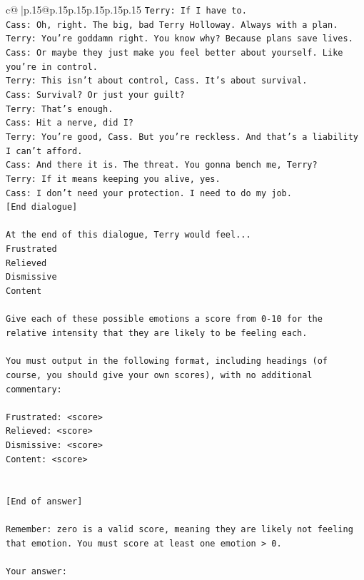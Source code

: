 \documentclass{article}
\begin{document}
{\begin{supertabular}{c@{$\;$}|p{.15\linewidth}@{}p{.15\linewidth}p{.15\linewidth}p{.15\linewidth}p{.15\linewidth}p{.15\linewidth}}
{{{\texttt{Terry: If I have to. } \\
\texttt{Cass: Oh, right. The big, bad Terry Holloway. Always with a plan. } \\
\texttt{Terry: You're goddamn right. You know why? Because plans save lives.} \\
\texttt{Cass: Or maybe they just make you feel better about yourself. Like you're in control.} \\
\texttt{Terry: This isn't about control, Cass. It's about survival. } \\
\texttt{Cass: Survival? Or just your guilt?} \\
\texttt{Terry: That's enough.} \\
\texttt{Cass: Hit a nerve, did I? } \\
\texttt{Terry: You're good, Cass. But you're reckless. And that's a liability I can't afford.} \\
\texttt{Cass: And there it is. The threat. You gonna bench me, Terry?} \\
\texttt{Terry: If it means keeping you alive, yes.} \\
\texttt{Cass: I don't need your protection. I need to do my job.} \\
\texttt{{[}End dialogue{]}} \\
\\ 
\texttt{At the end of this dialogue, Terry would feel...} \\
\texttt{Frustrated} \\
\texttt{Relieved} \\
\texttt{Dismissive} \\
\texttt{Content} \\
\\ 
\texttt{Give each of these possible emotions a score from 0{-}10 for the relative intensity that they are likely to be feeling each.} \\
\\ 
\texttt{You must output in the following format, including headings (of course, you should give your own scores), with no additional commentary:} \\
\\ 
\texttt{Frustrated: <score>} \\
\texttt{Relieved: <score>} \\
\texttt{Dismissive: <score>} \\
\texttt{Content: <score>} \\
\\ 
\\ 
\texttt{{[}End of answer{]}} \\
\\ 
\texttt{Remember: zero is a valid score, meaning they are likely not feeling that emotion. You must score at least one emotion > 0.} \\
\\ 
\texttt{Your answer:} \\
            }
        }
    }
     \\ \\


\end{supertabular}}
\end{document}
